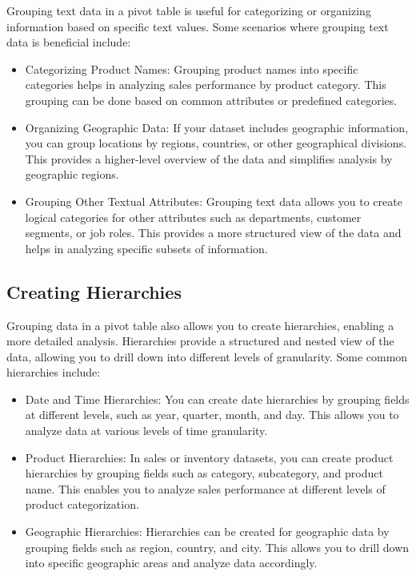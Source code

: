 \documentclass[
]{book}
\begin{document}
Grouping text data in a pivot table is useful for categorizing or organizing information based on specific text values. Some scenarios where grouping text data is beneficial include:

\begin{itemize}
\item
  Categorizing Product Names: Grouping product names into specific categories helps in analyzing sales performance by product category. This grouping can be done based on common attributes or predefined categories.
\item
  Organizing Geographic Data: If your dataset includes geographic information, you can group locations by regions, countries, or other geographical divisions. This provides a higher-level overview of the data and simplifies analysis by geographic regions.
\item
  Grouping Other Textual Attributes: Grouping text data allows you to create logical categories for other attributes such as departments, customer segments, or job roles. This provides a more structured view of the data and helps in analyzing specific subsets of information.
\end{itemize}

\hypertarget{creating-hierarchies}{%
\subsection{Creating Hierarchies}\label{creating-hierarchies}}

Grouping data in a pivot table also allows you to create hierarchies, enabling a more detailed analysis. Hierarchies provide a structured and nested view of the data, allowing you to drill down into different levels of granularity. Some common hierarchies include:

\begin{itemize}
\item
  Date and Time Hierarchies: You can create date hierarchies by grouping fields at different levels, such as year, quarter, month, and day. This allows you to analyze data at various levels of time granularity.
\item
  Product Hierarchies: In sales or inventory datasets, you can create product hierarchies by grouping fields such as category, subcategory, and product name. This enables you to analyze sales performance at different levels of product categorization.
\item
  Geographic Hierarchies: Hierarchies can be created for geographic data by grouping fields such as region, country, and city. This allows you to drill down into specific geographic areas and analyze data accordingly.
\end{itemize}
\end{document}
